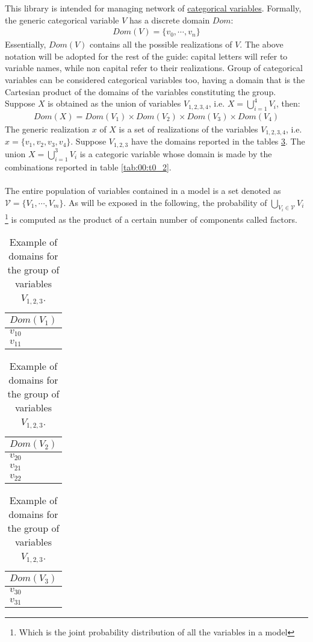 This library is intended for managing network of \underline{categorical variables}. Formally, the generic categorical variable $V$ has a discrete domain $Dom$: 
\begin{eqnarray}
Dom(V) = \lbrace v_0, \cdots , v_n \rbrace
\end{eqnarray}
Essentially, $Dom(V)$ contains all the possible realizations of $V$. The above notation will be adopted for the rest of the guide: capital letters will refer to variable names, while non capital refer to their realizations.
Group of categorical variables can be considered categorical variables too, having a domain that is the Cartesian product of the domains of the variables constituting the group. Suppose $X$ is obtained as the union of variables $V_{1,2,3,4}$, i.e. $X = \bigcup_{i=1}^{4}V_i$, then:
\begin{eqnarray}
  Dom(X)=Dom(V_1) \times Dom(V_2) \times Dom(V_3) \times Dom(V_4)
  \label{eq:00:dom_V}
\end{eqnarray}  
The generic realization $x$ of $X$ is a set of realizations of the variables $V_{1,2,3,4}$, i.e. $x=\lbrace v_1, v_2, v_3, v_4 \rbrace$. 
Suppose $V_{1,2,3}$ have the domains reported in the tables \ref{tab:00:t0_1}. The union $X = \bigcup_{i=1}^{3}V_i$ is a categoric variable whose domain is made by the combinations reported in table \ref{tab:00:t0_2}.
\\
\\
The entire population of variables contained in a model is  a set denoted as $\mathcal{V} = \lbrace {V}_1, \cdots, {V}_m \rbrace$.
As will be exposed in the following, the probability of $\bigcup_{V_i \in \mathcal{V}} V_i$ \footnote{Which is the joint probability distribution of all the variables in a model} is computed as the product of a certain number of components called factors.

\begin{table}[]
\centering
\begin{tabular}{|l|}
      $Dom(V_1)$  \\
      \hline
$v_{10}$ \\
\hline
$v_{11}$ \\
\hline 
\end{tabular}
\quad
\begin{tabular}{|l|}
      $Dom(V_2)$  \\
      \hline
$v_{20}$ \\
\hline
$v_{21}$ \\
\hline 
$v_{22}$ \\
\hline 
\end{tabular}
\quad
\begin{tabular}{|l|}
      $Dom(V_3)$  \\
      \hline
$v_{30}$ \\
\hline
$v_{31}$ \\
\hline 
\end{tabular}
\caption{Example of domains for the group of variables $V_{1,2,3}$.} 
\label{tab:00:t0_1}
\end{table}

